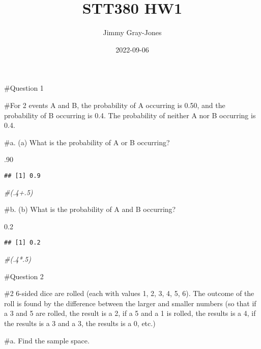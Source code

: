 \documentclass[
]{article}
\title{STT380 HW1}
\author{Jimmy Gray-Jones}
\date{2022-09-06}
\newenvironment{Shaded}{\begin{snugshade}}{\end{snugshade}}
\newcommand{\CommentTok}[1]{\textcolor[rgb]{0.56,0.35,0.01}{\textit{#1}}}
\newcommand{\DecValTok}[1]{\textcolor[rgb]{0.00,0.00,0.81}{#1}}
\newcommand{\FloatTok}[1]{\textcolor[rgb]{0.00,0.00,0.81}{#1}}
\newcommand{\NormalTok}[1]{#1}
\begin{document}
\maketitle

\#Question 1

\#For 2 events A and B, the probability of A occurring is 0.50, and the
probability of B occurring is 0.4. The probability of neither A nor B
occurring is 0.4.

\#a. (a) What is the probability of A or B occurring?

\begin{Shaded}
\begin{Highlighting}[]
\NormalTok{.}\DecValTok{90} 
\end{Highlighting}
\end{Shaded}

\begin{verbatim}
## [1] 0.9
\end{verbatim}

\begin{Shaded}
\begin{Highlighting}[]
\CommentTok{\#(.4+.5)}
\end{Highlighting}
\end{Shaded}

\#b. (b) What is the probability of A and B occurring?

\begin{Shaded}
\begin{Highlighting}[]
\FloatTok{0.2} 
\end{Highlighting}
\end{Shaded}

\begin{verbatim}
## [1] 0.2
\end{verbatim}

\begin{Shaded}
\begin{Highlighting}[]
\CommentTok{\#(.4*.5)}
\end{Highlighting}
\end{Shaded}

\#Question 2

\#2 6-sided dice are rolled (each with values 1, 2, 3, 4, 5, 6). The
outcome of the roll is found by the difference between the larger and
smaller numbers (so that if a 3 and 5 are rolled, the result is a 2, if
a 5 and a 1 is rolled, the results is a 4, if the results is a 3 and a
3, the results is a 0, etc.)

\#a. Find the sample space.
\end{document}
